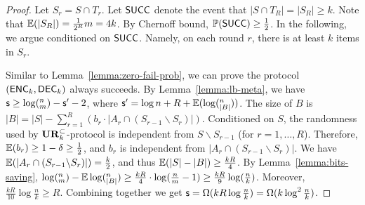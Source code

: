 \begin{proof}
  Let $S_r=S\cap T_r$. 
  Let $\textsf{SUCC}$ denote the event that $|S\cap T_R|=|S_R|\ge k$. 
  Note that $\operatorname*{\mathbb{E}}(|S_R|)=\frac{1}{2^R}m=4k$. By Chernoff bound, $\operatorname*{\mathbb{P}}(\textsf{SUCC})\ge \frac{1}{2}$. 
  In the following, we argue conditioned on $\textsf{SUCC}$. Namely, on each round $r$, there is at least $k$ items in $S_r$.  
  
  Similar to Lemma~\ref{lemma:zero-fail-prob}, we can prove the protocol $(\textsf{ENC}_k,\textsf{DEC}_k)$ always succeeds. 
  By Lemma~\ref{lemma:lb-meta}, we have $\textsf{s}\ge \log (^n_m) - \textsf{s}' -2$, where $\textsf{s}'=\log n + R+ \operatorname*{\mathbb{E}}(\log (^n_{|B|}))$. 
  The size of $B$ is $|B|=|S|-\sum_{r=1}^{R}{(b_r \cdot |A_r \cap (S_{r-1}\backslash S_r)|)}$.
  Conditioned on $S$, the randomness used by $\mathbf{UR}_k^\subset$-protocol is independent from $S\backslash S_{r-1}$ (for $r=1, \ldots, R$).
  Therefore, $\operatorname*{\mathbb{E}}(b_r)\ge 1-\delta\ge \frac{1}{2}$, and $b_r$ is independent from $|A_r \cap (S_{r-1}\backslash S_r)|$. 
  We have $\operatorname*{\mathbb{E}}(|A_r \cap (S_{r-1}\backslash S_r)|)=\frac{k}{2}$, and thus $\operatorname*{\mathbb{E}}(|S|-|B|)\ge \frac{kR}{4}$. 
  By Lemma~\ref{lemma:bits-saving}, $\log (^n_m)-\operatorname*{\mathbb{E}}\log (^n_{|B|})\ge \frac{kR}{4}\cdot \log (\frac{n}{m}-1) \ge \frac{kR}{9}\log (\frac{n}{k})$.
  Moreover, $\frac{kR}{10}\log \frac{n}{k}\ge R$.  
  Combining together we get $\textsf{s} = \Omega(kR\log\frac{n}{k}) = \Omega(k\log^2 \frac{n}{k} )$.
\end{proof}
